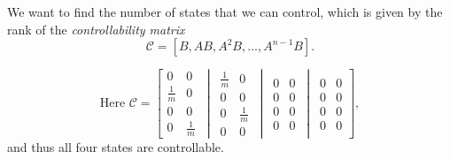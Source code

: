 We want to find the number of states that we can control, which is given by the rank of the \emph{controllability matrix}
\begin{equation}
\mathcal{C} = [ B, AB, A^2B, ... , A^{n-1}B ].
\end{equation}

\begin{equation}
\textrm{Here }
\mathcal{C}=\left[
\begin{matrix} 
0 & 0\\
\frac{1}{m} & 0 \\
0 & 0 \\
0 & \frac{1}{m}
\end{matrix}
\,\middle\vert\,
\begin{matrix} 
\frac{1}{m}& 0\\
0 & 0\\
0 & \frac{1}{m}\\
0 & 0
\end{matrix}
\,\middle\vert\,
\begin{matrix} 
0 & 0\\
0 & 0 \\
0 & 0 \\
0 & 0
\end{matrix}
\,\middle\vert\,
\begin{matrix} 
0 & 0\\
0 & 0\\
0 & 0\\
0 & 0
\end{matrix}
 \right],
\end{equation}
and thus all four states are controllable.

